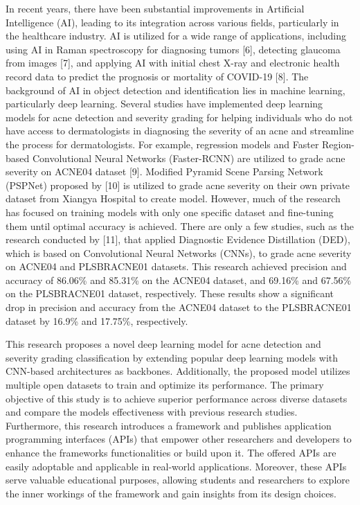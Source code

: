 \documentclass[16pt]{extarticle}
\begin{document}
In recent years, there have been substantial improvements in Artificial
Intelligence (AI), leading to its integration across various fields,
particularly in the healthcare industry. AI is utilized for a wide range
of applications, including using AI in Raman spectroscopy for diagnosing
tumors {[}6{]}, detecting glaucoma from images {[}7{]}, and applying AI
with initial chest X-ray and electronic health record data to predict
the prognosis or mortality of COVID-19 {[}8{]}. The background of AI in
object detection and identification lies in machine learning,
particularly deep learning. Several studies have implemented deep
learning models for acne detection and severity grading for helping
individuals who do not have access to dermatologists in diagnosing the
severity of an acne and streamline the process for dermatologists. For
example, regression models and Faster Region-based Convolutional Neural
Networks (Faster-RCNN) are utilized to grade acne severity on ACNE04
dataset {[}9{]}. Modified Pyramid Scene Parsing Network (PSPNet)
proposed by {[}10{]} is utilized to grade acne severity on their own
private dataset from Xiangya Hospital to create model. However, much of
the research has focused on training models with only one specific
dataset and fine-tuning them until optimal accuracy is achieved. There
are only a few studies, such as the research conducted by {[}11{]}, that
applied Diagnostic Evidence Distillation (DED), which is based on
Convolutional Neural Networks (CNNs), to grade acne severity on ACNE04
and PLSBRACNE01 datasets. This research achieved precision and accuracy
of 86.06\% and 85.31\% on the ACNE04 dataset, and 69.16\% and 67.56\% on
the PLSBRACNE01 dataset, respectively. These results show a significant
drop in precision and accuracy from the ACNE04 dataset to the
PLSBRACNE01 dataset by 16.9\% and 17.75\%, respectively.

This research proposes a novel deep learning model for acne detection
and severity grading classification by extending popular deep learning
models with CNN-based architectures as backbones. Additionally, the
proposed model utilizes multiple open datasets to train and optimize its
performance. The primary objective of this study is to achieve superior
performance across diverse datasets and compare the
model\textquotesingle s effectiveness with previous research studies.
Furthermore, this research introduces a framework and publishes
application programming interfaces (APIs) that empower other researchers
and developers to enhance the framework\textquotesingle s
functionalities or build upon it. The offered APIs are easily adoptable
and applicable in real-world applications. Moreover, these APIs serve
valuable educational purposes, allowing students and researchers to
explore the inner workings of the framework and gain insights from its
design choices.
\end{document}
